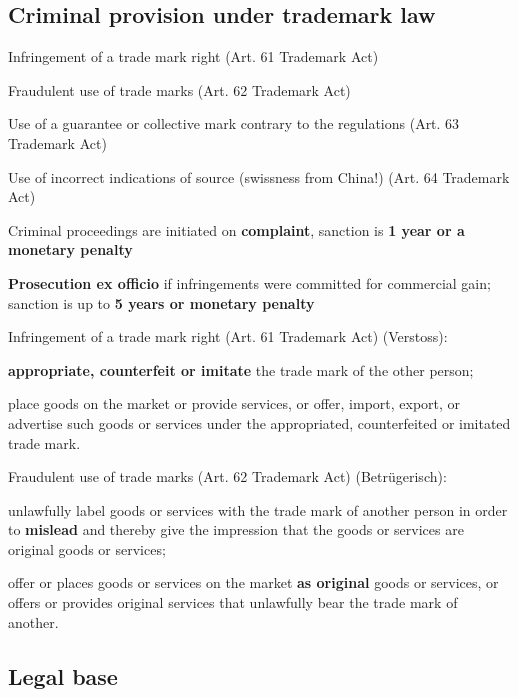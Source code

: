 \subsection{Criminal provision under trademark law}
\begin{compactitem}
	\item Infringement of a trade mark right (Art. 61 Trademark Act)
	\item Fraudulent use of trade marks (Art. 62 Trademark Act)
	\item Use of a guarantee or collective mark contrary to the regulations (Art. 63 Trademark Act)
	\item Use of incorrect indications of source (swissness from China!) (Art. 64 Trademark Act)
	\item Criminal proceedings are initiated on \textbf{complaint}, sanction is \textbf{1 year or a	monetary penalty}
	\item \textbf{Prosecution ex officio} if infringements were committed for commercial gain; sanction is up to \textbf{5 years or monetary penalty}
\end{compactitem}
Infringement of a trade mark right (Art. 61 Trademark Act) (Verstoss):
\begin{compactitem}
	\item \textbf{appropriate, counterfeit or imitate} the trade mark of the other person;
	\item place goods on the market or provide services, or offer, import, export, or advertise such goods or services under the appropriated, counterfeited or imitated trade mark.
\end{compactitem}
Fraudulent use of trade marks (Art. 62 Trademark Act) (Betrügerisch):
\begin{compactitem}
	\item unlawfully label goods or services with the trade mark of another person in order to \textbf{mislead} and thereby give the impression that the goods or services are original goods or services;
	\item offer or places goods or services on the market \textbf{as original} goods or services, or offers or provides original services that unlawfully bear the trade mark of another.
\end{compactitem}

\subsection{Legal base}
